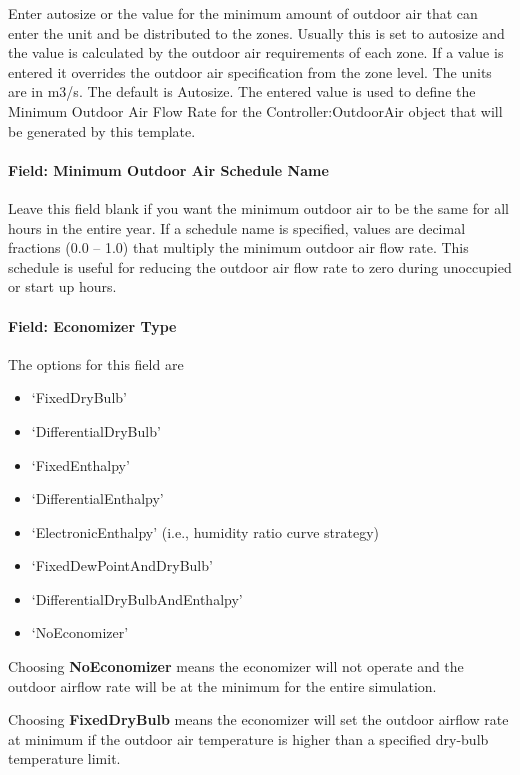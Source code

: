 Enter autosize or the value for the minimum amount of outdoor air that can enter the unit and be distributed to the zones. Usually this is set to autosize and the value is calculated by the outdoor air requirements of each zone. If a value is entered it overrides the outdoor air specification from the zone level. The units are in m3/s. The default is Autosize. The entered value is used to define the Minimum Outdoor Air Flow Rate for the Controller:OutdoorAir object that will be generated by this template.

\paragraph{Field: Minimum Outdoor Air Schedule Name}\label{field-minimum-outdoor-air-schedule-name-000}

Leave this field blank if you want the minimum outdoor air to be the same for all hours in the entire year. If a schedule name is specified, values are decimal fractions (0.0 -- 1.0) that multiply the minimum outdoor air flow rate. This schedule is useful for reducing the outdoor air flow rate to zero during unoccupied or start up hours.

\paragraph{Field: Economizer Type}\label{field-economizer-type}

The options for this field are

\begin{itemize}
\item
  `FixedDryBulb'
\item
  `DifferentialDryBulb'
\item
  `FixedEnthalpy'
\item
  `DifferentialEnthalpy'
\item
  `ElectronicEnthalpy' (i.e., humidity ratio curve strategy)
\item
  `FixedDewPointAndDryBulb'
\item
  `DifferentialDryBulbAndEnthalpy'
\item
  `NoEconomizer'
\end{itemize}

Choosing \textbf{NoEconomizer} means the economizer will not operate and the outdoor airflow rate will be at the minimum for the entire simulation.

Choosing \textbf{FixedDryBulb} means the economizer will set the outdoor airflow rate at minimum if the outdoor air temperature is higher than a specified dry-bulb temperature limit.

